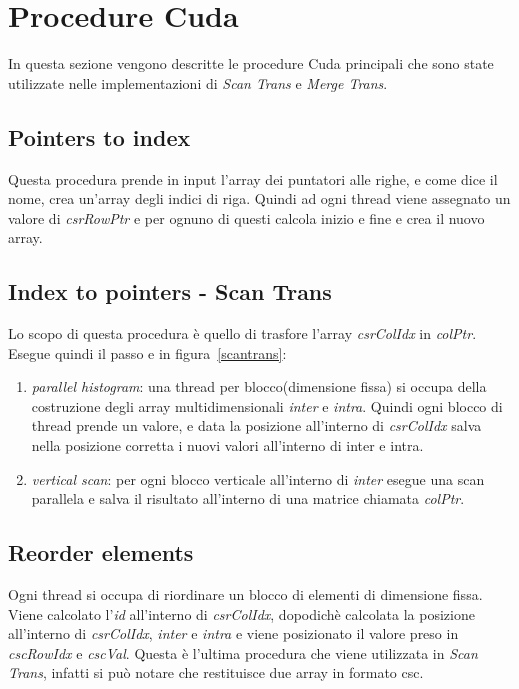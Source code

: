 \documentclass[]{IEEEtran}
\newcommand*\circled[1]{\tikz[baseline=(char.base)]{\node[shape=circle,draw,inner sep=2pt] (char) {#1};}}
\begin{document}
\section{Procedure Cuda}
\label{procedure}
	In questa sezione vengono descritte le procedure Cuda principali che sono state utilizzate nelle implementazioni di \textit{Scan Trans} e \textit{Merge Trans}.

	\subsection{Pointers to index}
	\label{pnt-to-idx}
	Questa procedura prende in input l'array dei puntatori alle righe, e come dice il nome, crea un'array degli indici di riga. Quindi ad ogni thread viene assegnato un valore di \textit{csrRowPtr} e per ognuno di questi calcola inizio e fine e crea il nuovo array.
	
	\subsection{Index to pointers - Scan Trans}
	\label{idx-to-pnt-scan}
	Lo scopo di questa procedura è quello di trasfore l'array \textit{csrColIdx} in \textit{colPtr}. Esegue quindi il passo \circled{1} e \circled{2} in figura~\ref{scantrans}:
	\begin{enumerate}
		\item \textit{parallel histogram}: una thread per blocco(dimensione fissa) si occupa della costruzione degli array multidimensionali \textit{inter} e \textit{intra}. Quindi ogni blocco di thread prende un valore, e data la posizione all'interno di \textit{csrColIdx} salva nella posizione corretta i nuovi valori all'interno di inter e intra.
		\item \textit{vertical scan}: per ogni blocco verticale all'interno di \textit{inter} esegue una scan parallela e salva il risultato all'interno di una matrice chiamata \textit{colPtr}.
	\end{enumerate}

	\subsection{Reorder elements}
	\label{reoder-elem}
	Ogni thread si occupa di riordinare un blocco di elementi di dimensione fissa. Viene calcolato l'\textit{id} all'interno di \textit{csrColIdx}, dopodichè calcolata la posizione all'interno di \textit{csrColIdx}, \textit{inter} e \textit{intra} e viene posizionato il valore preso in \textit{cscRowIdx} e \textit{cscVal}. 
	Questa è l'ultima procedura che viene utilizzata in \textit{Scan Trans}, infatti si può notare che restituisce due array in formato csc.
\end{document}
